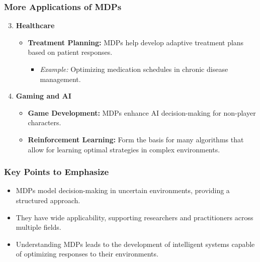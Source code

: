 \documentclass[aspectratio=169]{beamer}
\begin{document}
\begin{frame}[fragile]
  \frametitle{More Applications of MDPs}
  \begin{enumerate}
    \setcounter{enumi}{2}
    \item \textbf{Healthcare}
      \begin{itemize}
        \item \textbf{Treatment Planning:} MDPs help develop adaptive treatment plans based on patient responses.
          \begin{itemize}
            \item \textit{Example:} Optimizing medication schedules in chronic disease management.
          \end{itemize}
      \end{itemize}
  
    \item \textbf{Gaming and AI}
      \begin{itemize}
        \item \textbf{Game Development:} MDPs enhance AI decision-making for non-player characters.
        \item \textbf{Reinforcement Learning:} Form the basis for many algorithms that allow for learning optimal strategies in complex environments.
      \end{itemize}
  \end{enumerate}
\end{frame}

\begin{frame}[fragile]
  \frametitle{Key Points to Emphasize}
  \begin{itemize}
    \item MDPs model decision-making in uncertain environments, providing a structured approach.
    \item They have wide applicability, supporting researchers and practitioners across multiple fields.
    \item Understanding MDPs leads to the development of intelligent systems capable of optimizing responses to their environments.
  \end{itemize}
\end{frame}
\end{document}
